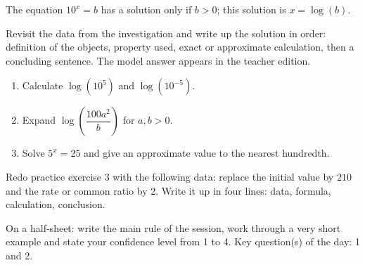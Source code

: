 \begin{traceecrite}The equation $10^x=b$ has a solution only if $b>0$; this solution is $x=\log(b)$.\end{traceecrite}

\begin{exemple}
Revisit the data from the investigation and write up the solution in order: definition of the objects, property used, exact or approximate calculation, then a concluding sentence. The model answer appears in the teacher edition.
\end{exemple}

\begin{exercice}[-- essential]
\begin{enumerate}\item Calculate $\log(10^5)$ and $\log(10^{-5})$.\item Expand $\log\!\left(\dfrac{100a^2}{b}\right)$ for $a,b>0$.\item Solve $5^x=25$ and give an approximate value to the nearest hundredth.\end{enumerate}
\end{exercice}


\begin{dm}Redo practice exercise 3 with the following data: replace the initial value by $210$ and the rate or common ratio by $2$. Write it up in four lines: data, formula, calculation, conclusion.\end{dm}

\begin{sortie}On a half-sheet: write the main rule of the session, work through a very short example and state your confidence level from 1 to 4. Key question(s) of the day: 1 and 2.\end{sortie}

